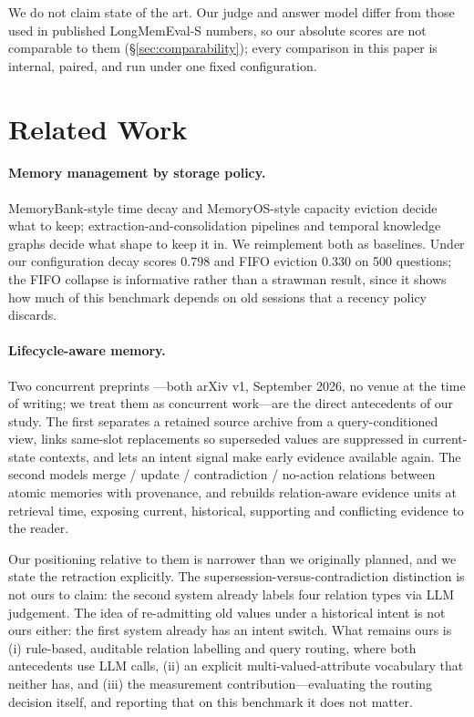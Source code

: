 \documentclass[11pt]{article}
\begin{document}
We do not claim state of the art. Our judge and answer model differ from those used in published LongMemEval-S numbers, so our absolute scores are not comparable to them (\S\ref{sec:comparability}); every comparison in this paper is internal, paired, and run under one fixed configuration.

\section{Related Work}
\label{sec:related}

\paragraph{Memory management by storage policy.} MemoryBank-style time decay \citep{memorybank} and MemoryOS-style capacity eviction \citep{memoryos} decide what to keep; extraction-and-consolidation pipelines \citep{mem0} and temporal knowledge graphs \citep{zep} decide what shape to keep it in. We reimplement both as baselines. Under our configuration decay scores $0.798$ and FIFO eviction $0.330$ on 500 questions; the FIFO collapse is informative rather than a strawman result, since it shows how much of this benchmark depends on old sessions that a recency policy discards.

\paragraph{Lifecycle-aware memory.} Two concurrent preprints \citep{rdforget,memorylace}---both arXiv v1, September 2026, no venue at the time of writing; we treat them as concurrent work---are the direct antecedents of our study. The first separates a retained source archive from a query-conditioned view, links same-slot replacements so superseded values are suppressed in current-state contexts, and lets an intent signal make early evidence available again. The second models merge / update / contradiction / no-action relations between atomic memories with provenance, and rebuilds relation-aware evidence units at retrieval time, exposing current, historical, supporting and conflicting evidence to the reader.

Our positioning relative to them is narrower than we originally planned, and we state the retraction explicitly. The supersession-versus-contradiction distinction is not ours to claim: the second system already labels four relation types via LLM judgement. The idea of re-admitting old values under a historical intent is not ours either: the first system already has an intent switch. What remains ours is (i) rule-based, auditable relation labelling and query routing, where both antecedents use LLM calls, (ii) an explicit multi-valued-attribute vocabulary that neither has, and (iii) the measurement contribution---evaluating the routing decision itself, and reporting that on this benchmark it does not matter.
\end{document}
